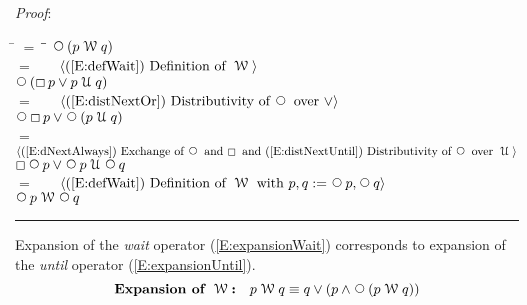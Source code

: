 \documentclass[12pt, fleqn, leqno]{article}
\newcommand{\lgap}{2pt}                             %
\newcommand{\mymathindent}{24pt}                    %
\newcommand{\Until}{\;\mathcal{U}\;}
\newcommand{\Wait}{\;\mathcal{W}\;}
\newcommand{\Next}{\;\,\text{\raisebox{3.5pt}{\circle{6}}}}
\newcommand{\Always}{\Box\,}
\newcommand{\myqed}{\rule[-.23ex]{1.2ex}{2.0ex}}
\newcommand{\myqedtab}{\hspace{384pt}}              %
\newcommand{\Gll} {\langle}                         %
\newcommand{\Ggg} {\rangle}                         %
\newcommand{\Hint}[1]     {\ \ \ $\Gll              \mbox{#1} \Ggg$ }   %
\begin{document}
\emph{Proof}:
\begin{tabbing}
\hspace{\mymathindent} \= $= \;$ \= \myqedtab \= \kill
\> \> $\Next (p \Wait q)$\\[\lgap]
\> $=$ \> \Hint{(\ref{E:defWait}) Definition of $\Wait$} \\[\lgap]
\> \> $\Next(\Always p\lor p\Until q)$\\[\lgap]
\> $=$ \> \Hint{(\ref{E:distNextOr}) Distributivity of $\Next$ over $\lor$} \\[\lgap]
\> \> $\Next \Always p\lor \Next(p\Until q)$\\[\lgap]
\> $=$ \> \Hint{(\ref{E:dNextAlways}) Exchange of $\Next$ and $\Always$ and (\ref{E:distNextUntil}) Distributivity of $\Next$ over $\Until$} \\[\lgap]
\> \> $\Always \Next p\lor \Next p\Until \Next q$\\[\lgap]
\> $=$ \> \Hint{(\ref{E:defWait}) Definition of $\Wait$ with $p,q := \Next p, \Next q$} \\[\lgap]
\> \> $\Next p \Wait \Next q$ \quad \myqed
\end{tabbing}

Expansion of the \textit{wait} operator (\ref{E:expansionWait}) corresponds to expansion of the \textit{until} operator (\ref{E:expansionUntil}).
\begin{equation}\label{E:expansionWait}
\textbf{Expansion of $\Wait$:}\quad p \Wait q \equiv q \lor (p \land \Next (p \Wait q))
\end{equation}
\end{document}
